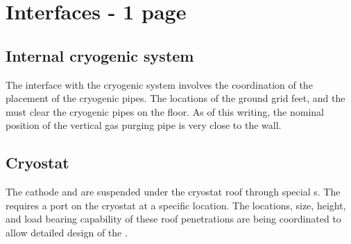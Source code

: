 



\section{Interfaces - 1 page}
\label{sec:fddp-hv-transport-interfaces}



\subsection{Internal cryogenic system}
\label{sec:fddp-hv-intfc-to-cryogenic}

The interface with the cryogenic system involves the coordination of the placement of the cryogenic pipes. The locations of the ground grid feet, and the  must clear the cryogenic pipes on the floor. As of this writing, the nominal position of the vertical gas purging pipe is very close to the  wall.


\subsection{Cryostat}
\label{sec:fddp-hv-intfc-to-cryostat}

The cathode and  are suspended under the cryostat roof through special \fdth{}s. The  \fdth requires a port on the cryostat at a specific location.  The locations, size, height, and load bearing capability of these roof penetrations are being coordinated to allow detailed design of the .



